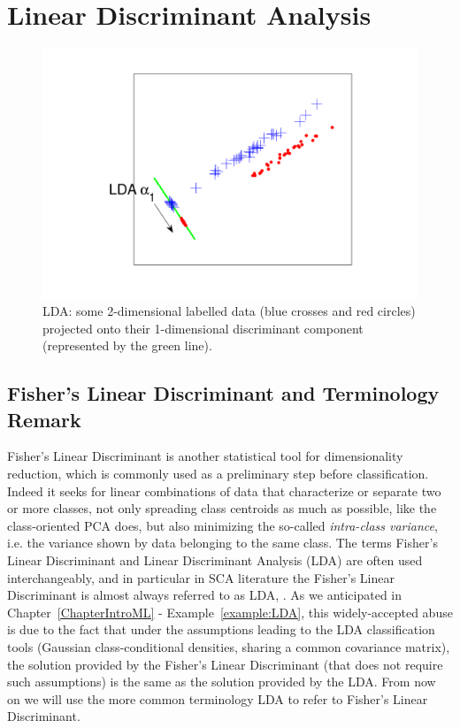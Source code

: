 
\section{Linear Discriminant Analysis}\label{sec:LDA}

\begin{figure}
\centering
\includegraphics[width=.5\textwidth]{../Figures/PCA_LDA_geometric/LDAprojection.pdf} 
\caption{LDA: some 2-dimensional labelled data (blue crosses and red circles) projected onto their 1-dimensional discriminant component (represented by the green line).}\label{fig:LDAprojection}
\end{figure}

\subsection{Fisher's Linear Discriminant and Terminology Remark}
Fisher's Linear Discriminant \cite{Fukunaga} is another statistical tool for dimensionality reduction, which is commonly used as a preliminary step before classification. Indeed it seeks for linear combinations of data that characterize or separate two or more classes, not only spreading class centroids as much as possible, like the class-oriented PCA does, but also minimizing the so-called {\em intra-class variance}, i.e. the variance shown by data belonging to the same class. The terms Fisher's Linear Discriminant and Linear Discriminant Analysis (LDA) are often used interchangeably, and in particular in SCA literature the Fisher's Linear Discriminant is almost always referred to as LDA, \eg \cite{lessIsMore,Standaert2008}. As we anticipated in Chapter~\ref{ChapterIntroML} - Example~\ref{example:LDA}, this widely-accepted abuse is due to the fact that under the assumptions leading to the LDA classification tools (\ie Gaussian class-conditional densities, sharing a common covariance matrix), the solution provided by the Fisher's Linear Discriminant (that does not require such assumptions) is the same as the solution provided by the LDA. From now on we will use the more common terminology LDA to refer to Fisher's Linear Discriminant. \\

